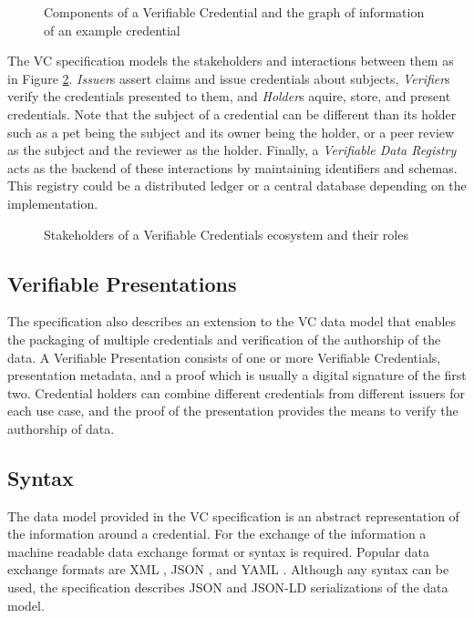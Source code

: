 \begin{figure}[htbp]
  \centering
  
  
  \caption{Components of a Verifiable Credential and the graph of information of an example credential \parencite{Sporny.18Kas2019}} \label{fig:credentialGraph}
\end{figure}

The VC specification models the stakeholders and interactions between them as in Figure \ref{fig:ecosystem}. \textit{Issuer}s assert claims and issue credentials about subjects, \textit{Verifier}s verify the credentials presented to them, and \textit{Holder}s aquire, store, and present credentials. Note that the subject of a credential can be different than its holder such as a pet being the subject and its owner being the holder, or a peer review as the subject and the reviewer as the holder. Finally, a \textit{Verifiable Data Registry} acts as the backend of these interactions by maintaining identifiers and schemas. This registry could be a distributed ledger or a central database depending on the implementation.

\begin{figure}[htbp]
  \centering
  
  \caption{Stakeholders of a Verifiable Credentials ecosystem and their roles \parencite{Sporny.18Kas2019}} \label{fig:ecosystem}
\end{figure}

\subsection{Verifiable Presentations}

The specification also describes an extension to the VC data model that enables the packaging of multiple credentials and verification of the authorship of the data. A Verifiable Presentation consists of one or more Verifiable Credentials, presentation metadata, and a proof which is usually a digital signature of the first two. Credential holders can combine different credentials from different issuers for each use case, and the proof of the presentation provides the means to verify the authorship of data.

\subsection{Syntax}

The data model provided in the VC specification is an abstract representation of the information around a credential. For the exchange of the information a machine readable data exchange format or syntax is required. Popular data exchange formats are XML \parencite{xmlRFC}, JSON \parencite{jsonRFC}, and YAML \parencite{yaml}. Although any syntax can be used, the specification describes JSON and JSON-LD \parencite{jsonld} serializations of the data model. 

